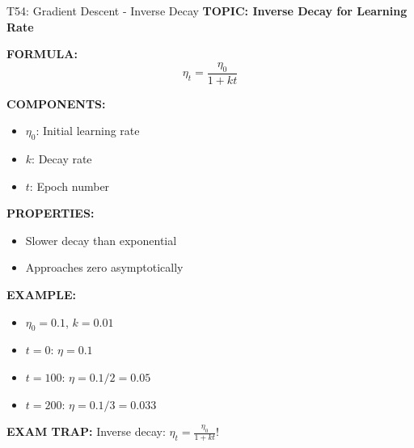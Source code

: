 \documentclass[8pt]{beamer}
\begin{document}
	\begin{frame}{T54: Gradient Descent - Inverse Decay}
		\fontsize{6.5}{7.5}\selectfont
		\textbf{TOPIC: Inverse Decay for Learning Rate}
		
		\vspace{0.1cm}
		\textbf{FORMULA:}
		\[
		\eta_t = \frac{\eta_0}{1 + kt}
		\]
		
		\vspace{0.1cm}
		\textbf{COMPONENTS:}
		\begin{itemize}
			\item $\eta_0$: Initial learning rate
			\item $k$: Decay rate
			\item $t$: Epoch number
		\end{itemize}
		
		\vspace{0.1cm}
		\textbf{PROPERTIES:}
		\begin{itemize}
			\item Slower decay than exponential
			\item Approaches zero asymptotically
		\end{itemize}
		
		\vspace{0.1cm}
		\textbf{EXAMPLE:}
		\begin{itemize}
			\item $\eta_0 = 0.1$, $k = 0.01$
			\item $t = 0$: $\eta = 0.1$
			\item $t = 100$: $\eta = 0.1/2 = 0.05$
			\item $t = 200$: $\eta = 0.1/3 = 0.033$
		\end{itemize}
		
		\textcolor{myred}{\textbf{EXAM TRAP:}} Inverse decay: $\eta_t = \frac{\eta_0}{1 + kt}$!
	\end{frame}
	
\end{document}
